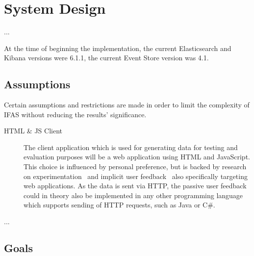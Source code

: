 %
\chapter{System Design}
\label{ch:design}

...

At the time of beginning the implementation, the current Elasticsearch and Kibana versions were 6.1.1, the current Event Store version was 4.1.

\section{Assumptions}
\label{sec:design:assumptions}

Certain assumptions and restrictions are made in order to limit the complexity of \acf{IFAS} without reducing the results' significance.

\begin{description}
\item[HTML \& JS Client] The client application which is used for generating data for testing and evaluation purposes will be a web application using \ac{HTML} and JavaScript.
This choice is influenced by personal preference, but is backed by research on experimentation~\cite{Dmitriev2017,Kohavi2013a} and implicit user feedback~\cite{Joachims2005,Huang2011} also specifically targeting web applications.
As the data is sent via \ac{HTTP}, the passive user feedback could in theory also be implemented in any other programming language which supports sending of \ac{HTTP} requests, such as Java or C\#.
\item [...]
\end{description}

\section{Goals}
\label{sec:design:goals}

